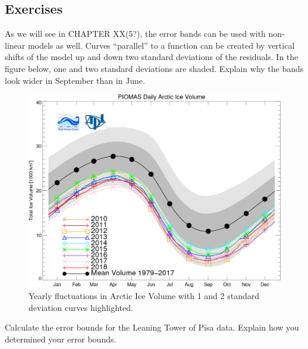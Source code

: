 \documentclass[10pt,]{book}
\theoremstyle{ptxdefinitionnotitle}
\theoremstyle{ptxdefinitiontitle}
\numberwithin{equation}{section}
\begin{document}
\subsection*{Exercises}\hypertarget{exercises-6}{}
\begin{divisionexercise}{1}\hypertarget{exercise-15}{}
\hypertarget{p-137}{}%
As we will see in CHAPTER XX(5?), the error bands can be used with non-linear models as well.   Curves “parallel” to a function can be created by vertical shifts of the model up and down two standard deviations of the residuals. In the figure below, one and two standard deviations are shaded. Explain why the bands look wider in September than in June.%
\begin{figure}
\centering
\includegraphics[width=1\linewidth]{src/images/chapter01/daily-artic-sea-ice-volume.png}
\caption{Yearly fluctuations in Arctic Ice Volume with 1 and 2 standard deviation curves highlighted.\label{figure-51}}
\end{figure}
\end{divisionexercise}%
\begin{divisionexercise}{2}\hypertarget{exercise-16}{}
\hypertarget{p-138}{}%
Calculate the error bounds for the Leaning Tower of Pisa data. Explain how you determined your error bounds.%
\end{divisionexercise}%
\end{document}
